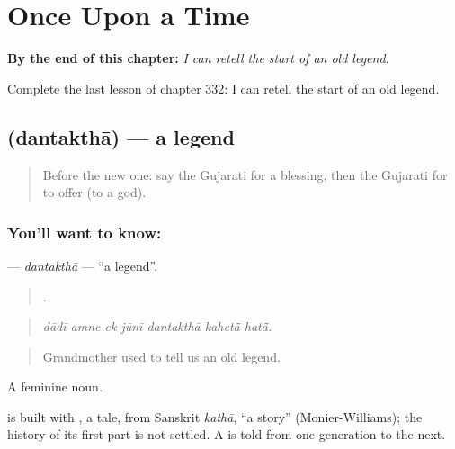 
\chapter{Once Upon a Time}
\label{ch:gu-once-upon-a-time}

\begin{chapteropening}
\textbf{By the end of this chapter:} \emph{I can retell the start of an old legend.}

Complete the last lesson of chapter 332: I can retell the start of an old legend.
\end{chapteropening}

\section[\texorpdfstring{\gu{દંતકથા} (dantakthā)}{દંતકથા (dantakthā)}]{ (dantakthā) — a legend}

\label{lesson:GU-C332-dantaktha}



\begin{quote}
Before the new one: say the Gujarati for a blessing, then the Gujarati for to offer (to a god).
\end{quote}

\subsection*{You'll want to know: }
\textbf{} — \emph{dantakthā} — \textquotedblleft{}a legend\textquotedblright{}.

\begin{quote}
      .
\end{quote}

\begin{quote}
\emph{dādī amne ek jūnī dantakthā kahetā̃ hatā̃.}
\end{quote}

\begin{quote}
Grandmother used to tell us an old legend.
\end{quote}

A feminine noun.

\begin{cousinweb}
is built with \textbf{}, a tale, from Sanskrit \emph{kathā}, \textquotedblleft{}a story\textquotedblright{} (Monier-Williams); the history of its first part is not settled. A \textbf{} is told from one generation to the next.
\end{cousinweb}

